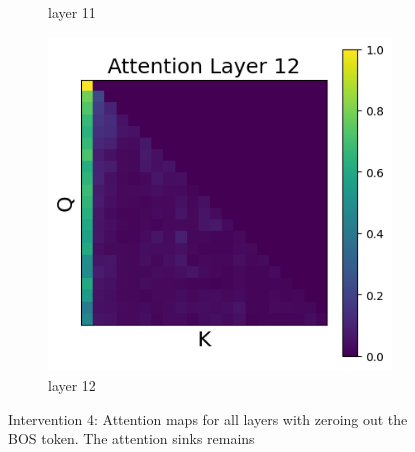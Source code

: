 \documentclass[11pt]{article}
\begin{document}
\begin{figure}[t]
\begin{subfigure}[t]{0.24\textwidth}
    \caption{layer 11}
  \end{subfigure}\hfill
  \begin{subfigure}[t]{0.24\textwidth}
    \centering
    \includegraphics[width=1.4\columnwidth]{figures/intervention4/layer_12.png}
    \caption{layer 12}
  \end{subfigure}\hfill

  \caption{Intervention 4: Attention maps for all layers with zeroing out the BOS token. The attention sinks remains}
\end{figure}
\end{document}
